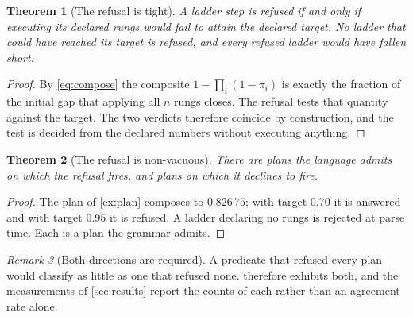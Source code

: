 \documentclass[11pt,twocolumn,a4paper]{article}
\theoremstyle{plain}
\newtheorem{theorem}{Theorem}[section]
\theoremstyle{definition}
\theoremstyle{remark}
\newtheorem{remark}[theorem]{Remark}
\newcommand{\pow}{\pi}
\begin{document}
\begin{theorem}[The refusal is tight]
\label{thm:tight}
A ladder step is refused if and only if executing its declared rungs would fail
to attain the declared target. No ladder that could have reached its target is
refused, and every refused ladder would have fallen short.
\end{theorem}

\begin{proof}
By \cref{eq:compose} the composite $1-\prod_i(1-\pow_i)$ is exactly the
fraction of the initial gap that applying all $n$ rungs closes. The refusal
tests that quantity against the target. The two verdicts therefore coincide by
construction, and the test is decided from the declared numbers without
executing anything.
\end{proof}

\begin{theorem}[The refusal is non-vacuous]
\label{thm:nonvacuous}
There are plans the language admits on which the refusal fires, and plans on
which it declines to fire.
\end{theorem}

\begin{proof}
The plan of \cref{ex:plan} composes to $0.826\,75$; with target $0.70$ it is
answered and with target $0.95$ it is refused. A ladder declaring no rungs is
rejected at parse time. Each is a plan the grammar admits.
\end{proof}

\begin{remark}[Both directions are required]
\label{rem:bothways}
A predicate that refused every plan would classify as little as one that
refused none.  therefore exhibits both, and the
measurements of \cref{sec:results} report the counts of each rather than an
agreement rate alone.
\end{remark}
\end{document}
